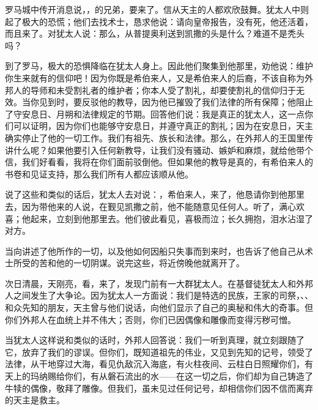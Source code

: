 罗马城中传开消息说，，的兄弟，要来了。信从天主的人都欢欣鼓舞。犹太人中则起了极大的恐慌；他们去找术士，恳求他说：请向皇帝报告，没有死，他还活着，而且来了。对犹太人说：那么，从普提奥利送到凯撒的头是什么？难道不是秃头吗？\par

到了罗马，极大的恐惧降临在犹太人身上。因此他们聚集到他那里，劝他说：维护你生来就有的信仰吧！因为你既是希伯来人，又是希伯来人的后裔，不该自称为外邦人的导师和未受割礼者的维护者；你本人受了割礼，却要使割礼的信仰归于无效。当你见到时，要反驳他的教导，因为他已摧毁了我们法律的所有保障；他阻止了守安息日、月朔和法律规定的节期。回答他们说：我是真正的犹太人，这一点你们可以证明，因为你们也能够守安息日，并遵守真正的割礼；因为在安息日，天主确实停止了他的一切工作。我们有祖先、族长和法律。那么，在外邦人的王国里传讲什么呢？如果他要引入任何新教导，让我们没有骚动、嫉妒和麻烦，就给他带个信，我们好看看，我将在你们面前驳倒他。但如果他的教导是真的，有希伯来人的书卷和见证支持，那么我们所有人都应该顺从他。\par

说了这些和类似的话后，犹太人去对说：，希伯来人，来了，他恳请你到他那里去，因为带他来的人说，在觐见凯撒之前，他不能随意见任何人。听了，满心欢喜；他起来，立刻到他那里去。他们彼此看见，喜极而泣；长久拥抱，泪水沾湿了对方。\par

当向讲述了他所作的一切，以及他如何因船只失事而到来时，也告诉了他自己从术士所受的苦和他的一切阴谋。说完这些，将近傍晚他就离开了。\par

次日清晨，天刚亮，看，来了，发现门前有一大群犹太人。在基督徒犹太人和外邦人之间发生了大争论。因为犹太人一方面说：我们是特选的民族，王家的司祭，、、和众先知的朋友，天主曾与他们说话，向他们显示了自己的奥秘和伟大的奇事。但你们外邦人在血统上并不伟大；否则，你们已因偶像和雕像而变得污秽可憎。\par

当犹太人这样说和类似的话时，外邦人回答说：我们一听到真理，就立刻跟随了它，放弃了我们的谬误。但你们，既知道祖先的伟业，又见到先知的记号，领受了法律，从干地穿过大海，看见仇敌沉入海底，有火柱夜间、云柱白日照耀你们，有天上的玛纳赐给你们，有从磐石流出的水——在这一切之后，你们却为自己铸造了牛犊的偶像，敬拜了雕像。但我们，虽未见过任何记号，却相信你们因不信而离弃的天主是救主。\par

